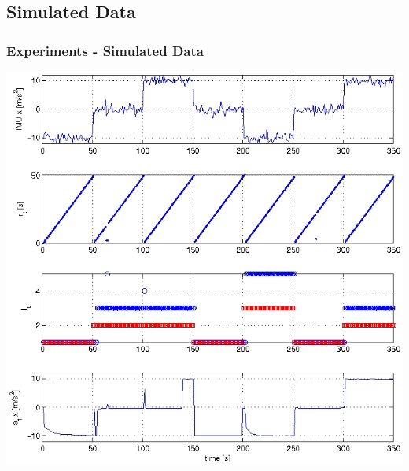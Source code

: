 \documentclass{beamer}
\begin{document}
\subsection{Simulated Data}
\begin{frame}[t]
  \frametitle{Experiments - Simulated Data}
  \begin{center}
    \includegraphics[scale=0.33]{figures/simResult}
  \end{center}
\end{frame}
\end{document}
